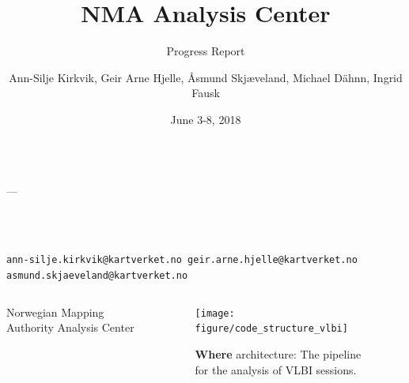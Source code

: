 \documentclass{beamer}
\title{NMA Analysis Center}
\subtitle{Progress Report}
\author{Ann-Silje Kirkvik, Geir Arne Hjelle, {\AA}smund Skj{\ae}veland, Michael D\"ahnn, Ingrid Fausk}
\institute{Norwegian Mapping Authority, Geodetic Institute}
\date{June 3-8, 2018}
\makeatletter
\newcommand{\contact}{ann-silje.kirkvik@kartverket.no geir.arne.hjelle@kartverket.no asmund.skjaeveland@kartverket.no}
\makeatother
\begin{document}
\begin{frame}[t]
  \color{white} 
  \vspace*{2cm}
  \begin{columns}
    \begin{column}[t]{.97\textwidth}
      {\bfseries\fontsize{88}{120}\selectfont \inserttitle}
      {\fontsize{88}{120}\selectfont\kern2cm---\kern2cm\insertsubtitle}
    \end{column}
  \end{columns}

  \vspace*{2cm}
  \begin{columns}
    \begin{column}[t]{.25\textwidth}
      {\fontsize{30}{36}\selectfont\insertauthor\\[0.5cm]
        \fontsize{30}{36}\selectfont{\itshape\insertinstitute}\\
        \fontsize{24}{18}\selectfont\texttt{\contact}}
    \end{column}

    \begin{column}[t]{.7\textwidth}
      {\fontsize{30}{36}\selectfont\setlength{\parskip}{30pt}}
    \end{column}
  \end{columns}

  \begin{columns}

    \begin{column}[t]{.72\textwidth}
      \begin{block}{Norwegian Mapping Authority Analysis Center}
        \begin{multicols}{3}
          
        \end{multicols}
      \end{block}
    \end{column}

    \begin{column}[t]{.24\textwidth}
      \vspace*{7cm} %
        \begin{figure}
             \texttt{[image: figure/code\_structure\_vlbi]}
             \caption{\textbf{Where} architecture: The pipeline for the analysis of VLBI sessions.}
            \label{fig:architecture}
        \end{figure}


\end{column}
\end{columns}
\end{frame}
\end{document}
